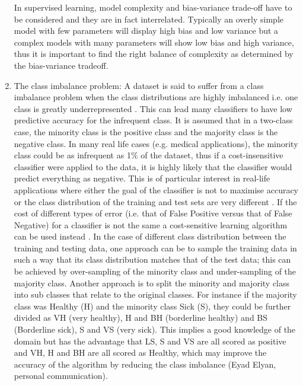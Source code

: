 \begin{enumerate}
In supervised learning, model complexity and bias-variance trade-off have to be considered and they are in fact interrelated. Typically an overly simple model with few parameters will display high bias and low variance \citep{Anonymous:vm} but a complex models with many parameters will show low bias and high variance, thus it is important to find the right balance of complexity as determined by the bias-variance tradeoff.

\item{The class imbalance problem:}\newline
A dataset is said to suffer from a class imbalance problem when the class distributions are highly imbalanced i.e. one class is greatly underrepresented \citep{Ling:2017jm}. This can lead many classifiers to have low predictive accuracy for the infrequent class. It is assumed that in a two-class case, the minority class is the positive class and the majority class is the negative class. In many real life cases (e.g. medical applications), the minority class could be as infrequent as 1\% of the dataset, thus if a cost-insensitive classifier were applied to the data, it is highly likely that the classifier would predict everything as negative. This is of particular interest in real-life applications where either the goal of the classifier is not to maximise accuracy or the class distribution of the training and test sets are very different \citep{Ling:2017jm}.\newline
If the cost of different types of error (i.e. that of False Positive versus that of False Negative) for a classifier is not the same a cost-sensitive learning algorithm can be used instead \citep{Ling:2017jm}.\newline
In the case of different class distribution between the training and testing data, one approach can be to sample the training data in such a way that its class distribution matches that of the test data; this can be achieved by over-sampling of the minority class and under-sampling of the majority class. \newline
Another approach is to split the minority and majority class into sub classes that relate to the original classes. For instance if the majority class was Healthy (H) and the minority class Sick (S), they could be further divided as VH (very healthy), H and BH (borderline healthy) and BS (Borderline sick), S and VS (very sick). This implies a good knowledge of the domain but has the advantage that LS, S and VS are all scored as positive and VH, H and BH are all scored as Healthy, which may improve the accuracy of the algorithm by reducing the class imbalance (Eyad Elyan, personal communication).\newline
\end{enumerate}

